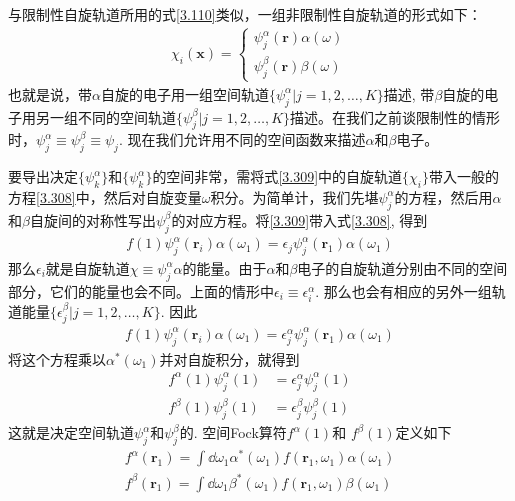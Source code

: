 与限制性自旋轨道所用的式\eqref{3.110}类似，一组非限制性自旋轨道的形式如下：
\begin{align}
\chi_i(\mathbf{x}) =
\begin{cases*}
\psi_j^\alpha(\mathbf{r})\alpha(\omega)\\
\psi_j^\beta (\mathbf{r})\beta(\omega)
\end{cases*}
\end{align}
也就是说，带$\alpha$自旋的电子用一组空间轨道$\{\psi_j^\alpha |j=1,2,\ldots,K \}$描述, 带$\beta$自旋的电子用另一组不同的空间轨道$\{\psi_j^\beta |j=1,2,\ldots,K \}$描述。在我们之前谈限制性的情形时，$\psi_j^\alpha \equiv \psi_j^\beta \equiv \psi_j$. 现在我们允许用不同的空间函数来描述$\alpha$和$\beta$电子。

要导出决定$\{\psi_k^\alpha \}$和$\{\psi_k^\alpha \}$的空间非常，需将式\eqref{3.309}中的自旋轨道$\{\chi_i\}$带入一般的\hft 方程\eqref{3.308}中，然后对自旋变量$\omega$积分。为简单计，我们先堪$\psi_j^\alpha$的方程，然后用$\alpha$和$\beta$自旋间的对称性写出$\psi_j^\beta$的对应方程。将\eqref{3.309}带入式\eqref{3.308}, 得到
\begin{align}
f(1)\psi_j^\alpha(\mathbf{r}_i) \alpha(\omega_1) = \epsilon_j \psi_j^\alpha(\mathbf{r}_1) \alpha(\omega_1)
\end{align}
那么$\epsilon_i$就是自旋轨道$\chi\equiv\psi_j^\alpha\alpha$的能量。由于$\alpha$和$\beta$电子的自旋轨道分别由不同的空间部分，它们的能量也会不同。上面的情形中$\epsilon_i\equiv\epsilon^\alpha_i$. 那么也会有相应的另外一组轨道能量$\{\epsilon_j^\beta | j=1,2,\ldots,K\}$. 因此
\begin{align}
f(1)\psi_j^\alpha(\mathbf{r}_i) \alpha(\omega_1) = \epsilon_j^\alpha \psi_j^\alpha(\mathbf{r}_1) \alpha(\omega_1)
\end{align}
将这个方程乘以$\alpha^*(\omega_1)$并对自旋积分，就得到
\begin{align}
f^\alpha(1)\psi_j^\alpha(1) & = \epsilon_j^\alpha \psi_j^\alpha(1)\\
f^\beta (1)\psi_j^\beta(1)  & = \epsilon_j^\beta \psi_j^\beta(1)
\end{align}
这就是决定空间轨道$\psi_j^\alpha$和$\psi_j^\beta$的. 空间Fock算符$f^\alpha(1)$和 $f^\beta (1)$定义如下
\begin{align}
f^\alpha(\mathbf{r}_1) = \int\dd\omega_1 \alpha^*(\omega_1) f(\mathbf{r}_1,\omega_1)\alpha(\omega_1)\\
f^\beta(\mathbf{r}_1) = \int\dd\omega_1 \beta^*(\omega_1) f(\mathbf{r}_1,\omega_1)\beta(\omega_1)
\end{align}

